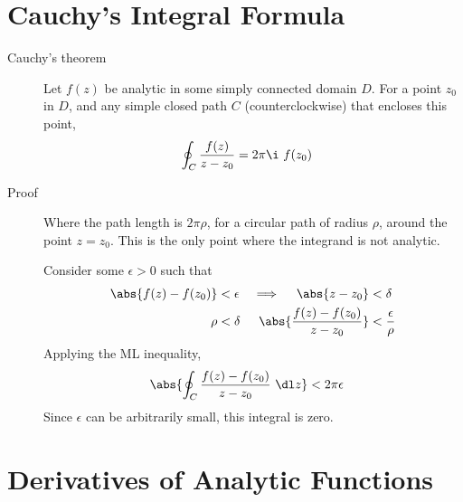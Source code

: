 \section{Cauchy's Integral Formula}
\begin{description}
    \item[Cauchy's theorem] Let $ f(z) $ be analytic in some simply connected domain
        $ D $. For a point $ z_0 $ in $ D $, and any simple closed path $ C $
        (counterclockwise) that encloses this point,
        \begin{align}
            \oint_C \frac{f(z)}{z - z_0} & = 2\pi \i\ f(z_0)
        \end{align}

    \item[Proof] Where the path length is $ 2\pi \rho $, for a circular path of radius
        $ \rho $, around the point $ z = z_0 $. This is the only point where the
        integrand is not analytic. \par
        Consider some $ \epsilon > 0 $ such that
        \begin{align}
            \abs{f(z) - f(z_0)}                 & < \epsilon              &
            \implies \quad \abs{z - z_0}        & < \delta                  \\
            \rho                                & < \delta                &
            \abs{\frac{f(z) - f(z_0)}{z - z_0}} & < \frac{\epsilon}{\rho}
        \end{align}
        Applying the ML inequality,
        \begin{align}
            \abs{\oint_C \frac{f(z) - f(z_0)}{z - z_0}\ \dl z} & < 2\pi \epsilon
        \end{align}
        Since $ \epsilon $ can be arbitrarily small, this integral is zero.
\end{description}

\section{Derivatives of Analytic Functions}

